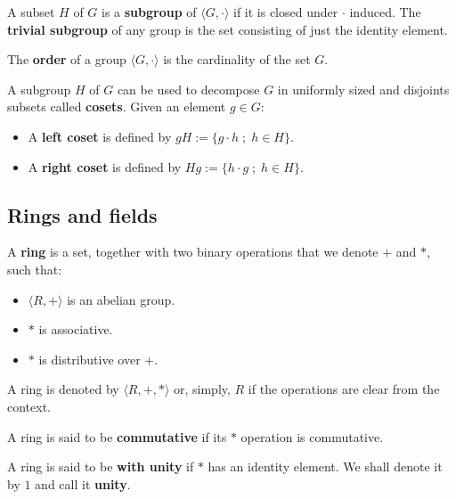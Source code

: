 \documentclass[a4paper,12pt]{article}
\begin{document}
\begin{definition}
  A subset $H$ of $G$ is a \textbf{subgroup} of $\langle G,\cdot \rangle$ if it is
  closed under $\cdot$ induced. The \textbf{trivial subgroup} of any
  group is the set consisting of just the identity element.
\end{definition}

\begin{definition}
  The \textbf{order} of a group $\langle G,\cdot\rangle$ is the cardinality of the set $G$.
\end{definition}

\begin{definition}
  A subgroup $H$ of $G$ can be used to decompose $G$ in uniformly sized and
  disjoints subsets called \textbf{cosets}. Given an element $g \in G$:
  \begin{itemize}
  \item A \textbf{left coset} is defined by $gH := \{g\cdot h \; ; \; h \in H\}$.
  \item A \textbf{right coset} is defined by $Hg := \{h\cdot g \; ; \; h \in H\}$.
  \end{itemize}
\end{definition}   
\subsection{Rings and fields}
\label{sec:org6176793}
   \begin{definition}
A \textbf{ring} is a set, together with two binary operations that we denote 
$+$ and $*$, such that:
\begin{itemize}
\item $\langle R,+\rangle$ is an abelian group.
\item $*$ is associative.
\item $*$ is distributive over $+$.
\end{itemize}

A ring is denoted by $\langle R,+,*\rangle$ or, simply, $R$ if the operations are clear from the context.
\end{definition}

\begin{definition}
  A ring is said to be \textbf{commutative} if its $*$ operation is commutative.
\end{definition}

\begin{definition}
  A ring is said to be \textbf{with unity} if $*$ has an identity element. We
  shall denote it by $1$ and call it  \textbf{unity}.

\end{definition}
\end{document}
